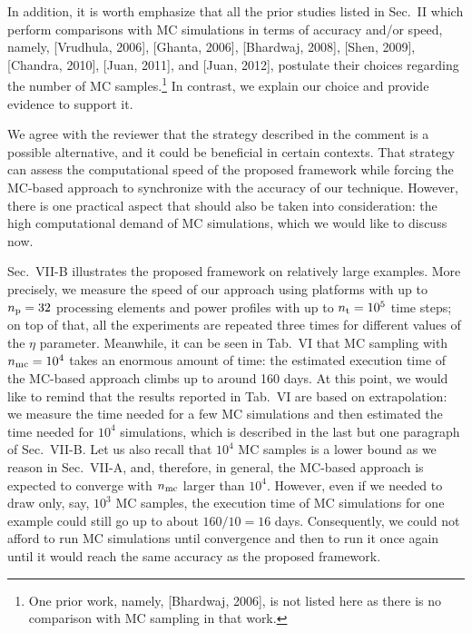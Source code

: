 \begin{authors}
In addition, it is worth emphasize that all the prior studies listed in Sec.~II which perform comparisons with MC simulations in terms of accuracy and/or speed, namely, [Vrudhula, 2006], [Ghanta, 2006], [Bhardwaj, 2008], [Shen, 2009], [Chandra, 2010], [Juan, 2011], and [Juan, 2012], postulate their choices regarding the number of MC samples.\footnote{One prior work, namely, [Bhardwaj, 2006], is not listed here as there is no comparison with MC sampling in that work.}
In contrast, we explain our choice and provide evidence to support it.

We agree with the reviewer that the strategy described in the comment is a possible alternative, and it could be beneficial in certain contexts.
That strategy can assess the computational speed of the proposed framework while forcing the MC-based approach to synchronize with the accuracy of our technique.
However, there is one practical aspect that should also be taken into consideration: the high computational demand of MC simulations, which we would like to discuss now.

Sec.~VII-B illustrates the proposed framework on relatively large examples.
More precisely, we measure the speed of our approach using platforms with up to ${n_\text{p}} = 32$ processing elements and power profiles with up to ${n_\text{t}} = 10^5$ time steps; on top of that, all the experiments are repeated three times for different values of the $\eta$ parameter.
Meanwhile, it can be seen in Tab.~VI that MC sampling with ${n_\text{mc}} = 10^4$ takes an enormous amount of time: the estimated execution time of the MC-based approach climbs up to around 160 days.
At this point, we would like to remind that the results reported in Tab.~VI are based on extrapolation: we measure the time needed for a few MC simulations and then estimated the time needed for $10^4$ simulations, which is described in the last but one paragraph of Sec.~VII-B.
Let us also recall that $10^4$ MC samples is a lower bound as we reason in Sec.~VII-A, and, therefore, in general, the MC-based approach is expected to converge with ${n_\text{mc}}$ larger than $10^4$.
However, even if we needed to draw only, say, $10^3$ MC samples, the execution time of MC simulations for one example could still go up to about $160 / 10 = 16$ days.
Consequently, we could not afford to run MC simulations until convergence and then to run it once again until it would reach the same accuracy as the proposed framework.

\begin{actions}
\end{actions}
\end{authors}

